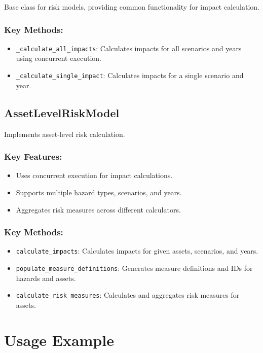 \documentclass{article}
\begin{document}
Base class for risk models, providing common functionality for impact calculation.

\subsubsection{Key Methods:}
\begin{itemize}
    \item \texttt{\_calculate\_all\_impacts}: Calculates impacts for all scenarios and years using concurrent execution.
    \item \texttt{\_calculate\_single\_impact}: Calculates impacts for a single scenario and year.
\end{itemize}

\subsection{AssetLevelRiskModel}

Implements asset-level risk calculation.

\subsubsection{Key Features:}
\begin{itemize}
    \item Uses concurrent execution for impact calculations.
    \item Supports multiple hazard types, scenarios, and years.
    \item Aggregates risk measures across different calculators.
\end{itemize}

\subsubsection{Key Methods:}
\begin{itemize}
    \item \texttt{calculate\_impacts}: Calculates impacts for given assets, scenarios, and years.
    \item \texttt{populate\_measure\_definitions}: Generates measure definitions and IDs for hazards and assets.
    \item \texttt{calculate\_risk\_measures}: Calculates and aggregates risk measures for assets.
\end{itemize}

\section{Usage Example}
\end{document}
